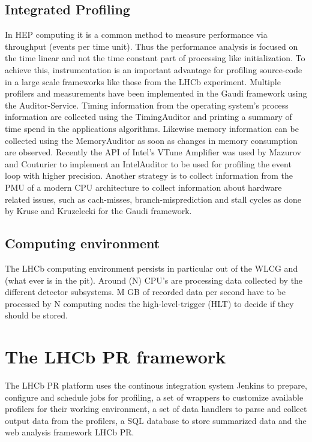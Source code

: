 \documentclass[a4paper]{jpconf}
\begin{document}
\subsection{Integrated Profiling}
\label{sec:integrated_profiling}

In HEP computing it is a common method to measure performance via throughput (events per time unit). Thus the performance analysis is focused on the time linear and not the time constant part of processing like initialization. To achieve this, instrumentation is an important advantage for profiling source-code in a large scale frameworks like those from the LHCb experiment. Multiple profilers and measurements have been implemented in the Gaudi framework using the Auditor-Service. Timing information from the operating system's process information are collected using the TimingAuditor and printing a summary of time spend in the applications algorithms. Likewise memory information can be collected using the MemoryAuditor as soon as changes in memory consumption are observed. Recently the API of Intel's VTune Amplifier was used by Mazurov and Couturier \cite{intel_auditor} to implement an IntelAuditor to be used for profiling the event loop with higher precision. Another strategy is to collect information from the PMU of a modern CPU architecture to collect information about hardware related issues, such as cach-misses, branch-misprediction and stall cycles as done by Kruse and Kruzelecki \cite{monitoring} for the Gaudi framework.

\subsection{Computing environment}
\label{sec:computing_environment}

The LHCb computing environment persists in particular out of the WLCG and (what ever is in the pit). Around (N) CPU's are processing data collected by the different detector subsystems. M GB of recorded data per second have to be processed by N computing nodes the high-level-trigger (HLT) to decide if they should be stored.

\section{The LHCb PR framework}
\label{sec:lhcbpr_framework}

The LHCb PR platform uses the continous integration system Jenkins \cite{jenkins} to prepare, configure and schedule jobs for profiling, a set of wrappers to customize available profilers for their working environment, a set of data handlers to parse and collect output data from the profilers, a SQL database to store summarized data and the web analysis framework LHCb PR. 
\end{document}
